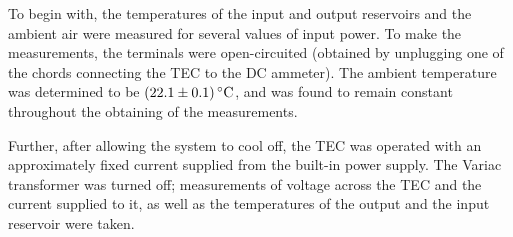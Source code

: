 \begin{paper}
	
	To begin with, the temperatures of the input and output reservoirs and the ambient air were measured for several values of input power. To make the measurements, the terminals were open-circuited (obtained by unplugging one of the chords connecting the TEC to the DC ammeter). The ambient temperature was determined to be \( \left(22.1 \pm 0.1\right) \si{\celsius} \), and was found to remain constant throughout the obtaining of the measurements. 
	
	
	Further, after allowing the system to cool off, the TEC was operated with an approximately fixed current supplied from the built-in power supply. The Variac transformer was turned off; measurements of voltage across the TEC and the current supplied to it, as well as the temperatures of the output and the input reservoir were taken.


\end{paper}
